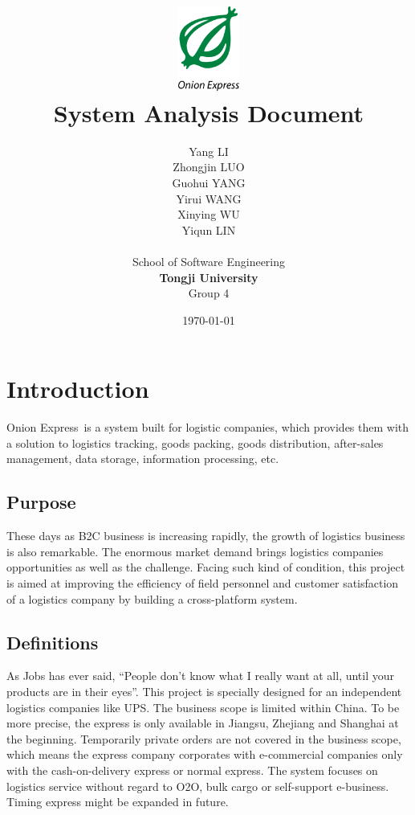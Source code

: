 \documentclass[12pt]{scrreprt}
\title{
\includegraphics[width=0.8in]{DocumentRes/OnionExpress.png} \\
\vspace*{1in}
\textbf{System Analysis Document}}
\author{Yang LI\\
        Zhongjin LUO\\
        Guohui YANG\\
        Yirui WANG\\
        Xinying WU\\
        Yiqun LIN\\
		    \vspace*{0.5in} \\
		    School of Software Engineering\\
        \textbf{Tongji University}\\
        Group 4\\
}
\date{\today}
\begin{document}
\maketitle
\tableofcontents

\chapter{Introduction}
Onion Express\textregistered\ is a system built for logistic companies,
which provides them with a solution to logistics tracking, goods packing,
goods distribution, after-sales management, data storage, information
processing, etc.

\section{Purpose}
These days as B2C business is increasing rapidly, the growth of
logistics business is also remarkable. The enormous market demand
brings logistics companies opportunities as well as the challenge.
Facing such kind of condition, this project is aimed at improving the
efficiency of field personnel and customer satisfaction of a logistics
company by building a cross-platform system.

\section{Definitions}
As Jobs has ever said, “People don't know what I really want at all,
until your products are in their eyes”. This project is specially
designed for an independent logistics companies like UPS. The business
scope is limited within China. To be more precise, the express is only
available in Jiangsu, Zhejiang and Shanghai at the beginning.
Temporarily private orders are not covered in the business scope,
which means the express company corporates with e-commercial companies only
with the cash-on-delivery express or normal express. The system focuses on logistics
service without regard to O2O, bulk cargo or self-support e-business.
Timing express might be expanded in future.
\end{document}
